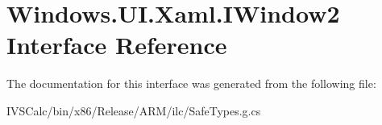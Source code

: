 \hypertarget{interface_windows_1_1_u_i_1_1_xaml_1_1_i_window2}{}\section{Windows.\+U\+I.\+Xaml.\+I\+Window2 Interface Reference}
\label{interface_windows_1_1_u_i_1_1_xaml_1_1_i_window2}


The documentation for this interface was generated from the following file\+:\begin{DoxyCompactItemize}
\item 
I\+V\+S\+Calc/bin/x86/\+Release/\+A\+R\+M/ilc/Safe\+Types.\+g.\+cs\end{DoxyCompactItemize}
